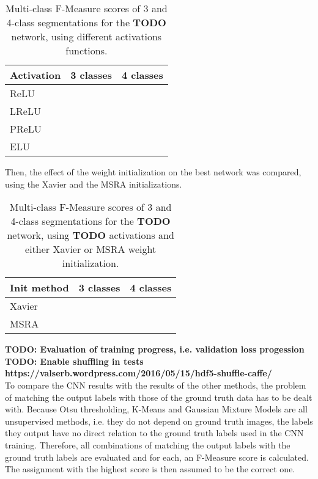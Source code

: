 \begin {table}
	\centering
	\begin {tabular}[!ht]{|l|c|c|}
		\hline
		\textbf{Activation}& \textbf{3 classes}& \textbf{4 classes}\\ \hline
		ReLU& & \\ \hline
		LReLU& & \\ \hline
		PReLU& & \\ \hline
		ELU& & \\ \hline
	\end {tabular}
\caption[]{Multi-class F-Measure scores of 3 and 4-class segmentations for the \textbf{TODO} network, using different activations functions.}
\end {table}

\noindent Then, the effect of the weight initialization on the best network was compared, using the Xavier and the MSRA initializations.

\begin {table}
	\centering
	\begin {tabular}[!ht]{|l|c|c|}
		\hline
		\textbf{Init method}& \textbf{3 classes}& \textbf{4 classes}\\ \hline
		Xavier& & \\ \hline
		MSRA& & \\ \hline
	\end {tabular}
\caption[]{Multi-class F-Measure scores of 3 and 4-class segmentations for the \textbf{TODO} network, using \textbf{TODO} activations and either Xavier or MSRA weight initialization.}
\end {table}

\textbf{TODO: Evaluation of training progress, i.e. validation loss progession}\\
\textbf{TODO: Enable shuffling in tests https://valserb.wordpress.com/2016/05/15/hdf5-shuffle-caffe/}\\


\noindent To compare the CNN results with the results of the other methods, the problem of matching the output labels with those of the ground truth data has to be dealt with. Because Otsu thresholding, K-Means and Gaussian Mixture Models are all unsupervised methods, i.e. they do not depend on ground truth images, the labels they output have no direct relation to the ground truth labels used in the CNN training. Therefore, all combinations of matching the output labels with the ground truth labels are evaluated and for each, an F-Measure score is calculated. The assignment with the highest score is then assumed to be the correct one.


